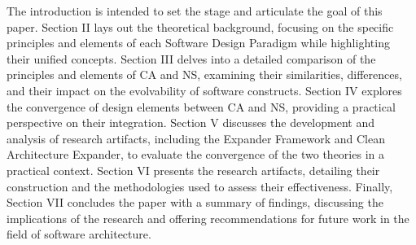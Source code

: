 The introduction is intended to set the stage and articulate the goal of this paper.
Section II lays out the theoretical background, focusing on the specific principles and
elements of each Software Design Paradigm while highlighting their unified concepts.
Section III delves into a detailed comparison of the principles and elements of CA and NS,
examining their similarities, differences, and their impact on the evolvability of
software constructs. Section IV explores the convergence of design elements between CA and
NS, providing a practical perspective on their integration. Section V discusses the
development and analysis of research artifacts, including the Expander Framework and Clean
Architecture Expander, to evaluate the convergence of the two theories in a practical
context. Section VI presents the research artifacts, detailing their construction and the
methodologies used to assess their effectiveness. Finally, Section VII concludes the paper
with a summary of findings, discussing the implications of the research and offering
recommendations for future work in the field of software architecture.